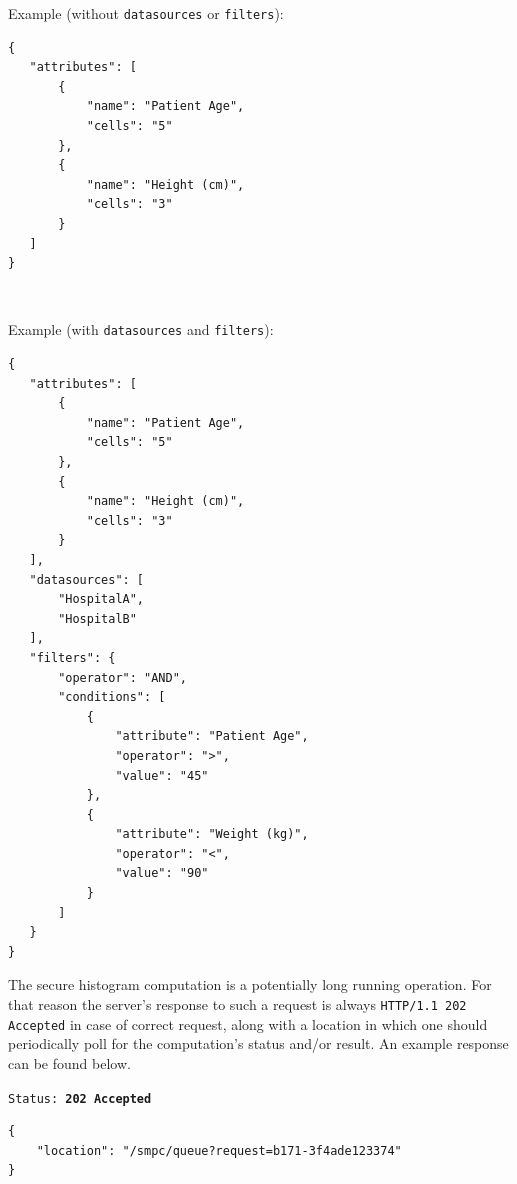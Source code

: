 \begin{description}[labelwidth=5em, leftmargin=\dimexpr\labelwidth+\labelsep\relax]
 \begin{minipage}{\linewidth}
   Example (without \texttt{datasources} or \texttt{filters}):
 {
 \begin{verbatim}
{
   "attributes": [
       {
           "name": "Patient Age",
           "cells": "5"
       },
       {
           "name": "Height (cm)",
           "cells": "3"
       }
   ]
}
 \end{verbatim}
 \label{sc:histogram-numerical-post-1}
 }
\end{minipage}
\ \\
 \begin{minipage}{\linewidth}
   Example (with \texttt{datasources} and \texttt{filters}):
 {
 \begin{verbatim}
{
   "attributes": [
       {
           "name": "Patient Age",
           "cells": "5"
       },
       {
           "name": "Height (cm)",
           "cells": "3"
       }
   ],
   "datasources": [
       "HospitalA",
       "HospitalB"
   ],
   "filters": {
       "operator": "AND",
       "conditions": [
           {
               "attribute": "Patient Age",
               "operator": ">",
               "value": "45"
           },
           {
               "attribute": "Weight (kg)",
               "operator": "<",
               "value": "90"
           }
       ]
   }
}
 \end{verbatim}
 \label{sc:histogram-numerical-post-2}
 }
\end{minipage}

\item[Response:] The secure histogram computation is a potentially long running operation. For that reason the server's response to such a request is always \texttt{HTTP/1.1 202 Accepted} in case of correct request, along with a location in which one should periodically poll for the computation's status and/or result. An example response can be found below.
\ \\

\begin{minipage}{\linewidth}
{
\texttt{Status: {\color{ForestGreen}\textbf{202 Accepted}}}
\begin{verbatim}
{
    "location": "/smpc/queue?request=b171-3f4ade123374"
}
\end{verbatim}
\label{sc:histogram-numerical-response-1}
}
\end{minipage}


\end{description}
